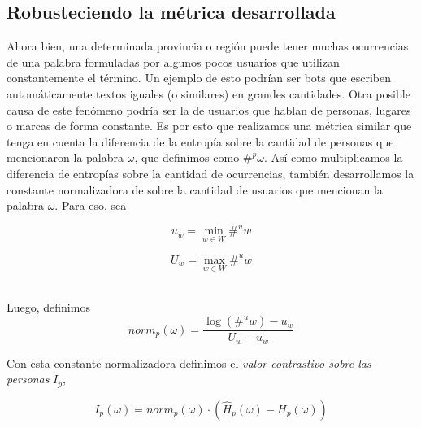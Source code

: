 \subsection{Robusteciendo la métrica desarrollada}

Ahora bien, una determinada provincia o región puede tener muchas ocurrencias de una palabra formuladas por algunos pocos usuarios que utilizan constantemente el término. Un ejemplo de esto podrían ser bots que escriben automáticamente textos iguales (o similares) en grandes cantidades. Otra posible causa de este fenómeno podría ser la de usuarios que hablan de personas, lugares o marcas de forma constante.
Es por esto que realizamos una métrica similar que tenga en cuenta la diferencia de la entropía sobre la cantidad de personas que mencionaron la palabra $\omega$, que definimos como $\#^p \omega$. Así como multiplicamos la diferencia de entropías sobre la cantidad de ocurrencias, también desarrollamos la constante normalizadora de sobre la cantidad de usuarios que mencionan la palabra $\omega$. 
Para eso, sea %

\noindent\begin{minipage}{.5\linewidth}
\begin{equation}
  u_w = \min \limits_{w \in W} \#^u w
\end{equation}
\end{minipage}%
\begin{minipage}{.5\linewidth}
\begin{equation}
  U_w = \max \limits_{w \in W} \#^u w
\end{equation}
\end{minipage}\\

Luego, definimos
\begin{equation}
norm_p(\omega) = \frac{\log(\#^u w) - u_w}{U_w - u_w}  
\label{eq:norm2}
\end{equation}

Con esta constante normalizadora definimos el \textit{valor contrastivo sobre las personas} $I_p$,

\begin{equation}
I_p(\omega) = norm_p(\omega) \cdot (\widehat{H}_p(\omega) - H_p(\omega))
\label{eq:iu}
\end{equation}


